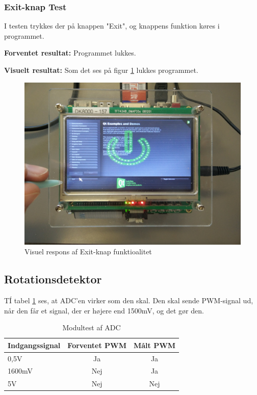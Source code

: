 \subsubsection{Exit-knap Test}
I testen trykkes der på knappen "Exit", og knappens funktion køres i programmet.\newline

\noindent\textbf{Forventet resultat:}\newline
\noindent Programmet lukkes.\newline

\noindent\textbf{Visuelt resultat:}\newline
Som det ses på figur \ref{fig:GUIExit} lukkes programmet.

\begin{figure}[H]
	\centering
	\includegraphics[width=.5\textwidth]{Test/images/GUITest/TestExit.jpg}
	\caption{Visuel respons af Exit-knap funktioalitet}
	\label{fig:GUIExit}
\end{figure}

\subsection{Rotationsdetektor}
TÍ tabel \ref{table:ADC_affyring_test} ses, at ADC'en virker som den skal. Den skal sende PWM-signal ud, når den får et signal, der er højere end 1500mV, og det gør den. 

\begin{table}[H]
	\centering
	\begin{tabular}{|l|c|c|}
		\hline
		\textbf{Indgangssignal} & \textbf{Forventet PWM}	& \textbf{Målt PWM} \\ \hline
		0,5V					& Ja                     	& Ja                \\ \hline
		1600mV					& Nej                    	& Ja                \\ \hline
		5V 						& Nej						& Nej                \\ \hline
	\end{tabular}
	\caption{Modultest af ADC}
	\label{table:ADC_affyring_test}
\end{table}

